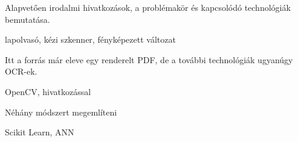 
Alapvetően irodalmi hivatkozások, a problémakör és kapcsolódó technológiák bemutatása.


lapolvasó, kézi szkenner, fényképezett változat

Itt a forrás már eleve egy renderelt PDF, de a további technológiák ugyanúgy OCR-ek.


OpenCV, hivatkozással


Néhány módszert megemlíteni


Scikit Learn, ANN
